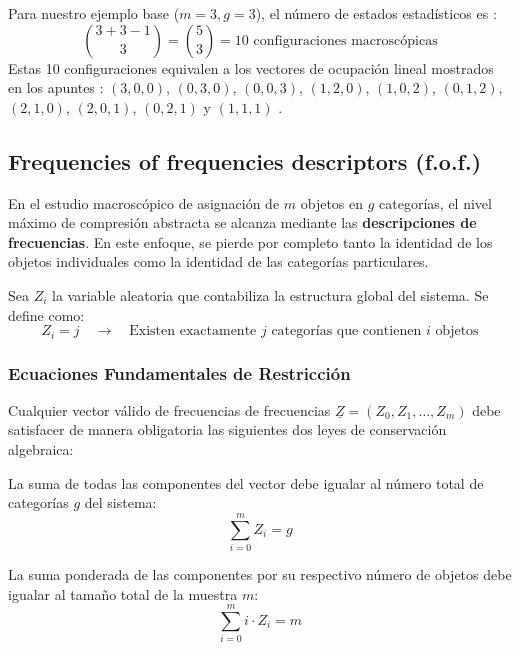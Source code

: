 Para nuestro ejemplo base ($m=3, g=3$), el número de estados estadísticos es :
\[
\binom{3+3-1}{3} = \binom{5}{3} = 10 \text{ configuraciones macroscópicas} 
\]
Estas 10 configuraciones equivalen a los vectores de ocupación lineal mostrados en los apuntes : $(3,0,0)$, $(0,3,0)$, $(0,0,3)$, $(1,2,0)$, $(1,0,2)$, $(0,1,2)$, $(2,1,0)$, $(2,0,1)$, $(0,2,1)$ y $(1,1,1)$ .

\subsection{Frequencies of frequencies descriptors (f.o.f.)}

En el estudio macroscópico de asignación de $m$ objetos en $g$ categorías, el nivel máximo de compresión abstracta se alcanza mediante las \textbf{descripciones de frecuencias}. En este enfoque, se pierde por completo tanto la identidad de los objetos individuales como la identidad de las categorías particulares.

\begin{definicion}
Sea $Z_i$ la variable aleatoria que contabiliza la estructura global del sistema. Se define como:
\begin{equation}
    Z_i = j \quad \longrightarrow \quad \text{Existen exactamente $j$ categorías que contienen $i$ objetos}
\end{equation}
\end{definicion}

\subsubsection{Ecuaciones Fundamentales de Restricción}

Cualquier vector válido de frecuencias de frecuencias $\underline{Z} = (Z_0, Z_1, \dots, Z_m)$ debe satisfacer de manera obligatoria las siguientes dos leyes de conservación algebraica:

\begin{prop}
La suma de todas las componentes del vector debe igualar al número total de categorías $g$ del sistema:
\begin{equation}
    \sum_{i=0}^{m} Z_i = g
\end{equation}
\end{prop}

\begin{prop}
La suma ponderada de las componentes por su respectivo número de objetos debe igualar al tamaño total de la muestra $m$:
\begin{equation}
    \sum_{i=0}^{m} i \cdot Z_i = m
\end{equation}
\end{prop}

